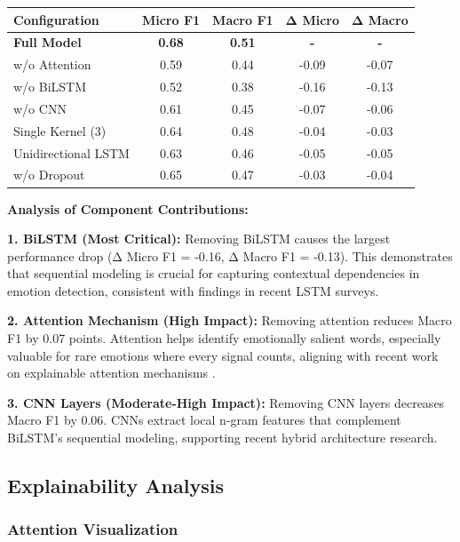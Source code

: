 \documentclass[12pt,a4paper]{article}
\begin{document}
\begin{tablebox}
\centering
\caption{Ablation Study Results}
\label{tab:ablation}
\begin{tabular}{lcccc}
\toprule
\textbf{Configuration} & \textbf{Micro F1} & \textbf{Macro F1} & \textbf{Δ Micro} & \textbf{Δ Macro} \\
\midrule
\textbf{Full Model} & \textbf{0.68} & \textbf{0.51} & \textbf{-} & \textbf{-} \\
\midrule
w/o Attention & 0.59 & 0.44 & -0.09 & -0.07 \\
w/o BiLSTM & 0.52 & 0.38 & -0.16 & -0.13 \\
w/o CNN & 0.61 & 0.45 & -0.07 & -0.06 \\
Single Kernel (3) & 0.64 & 0.48 & -0.04 & -0.03 \\
Unidirectional LSTM & 0.63 & 0.46 & -0.05 & -0.05 \\
w/o Dropout & 0.65 & 0.47 & -0.03 & -0.04 \\
\bottomrule
\end{tabular}
\end{tablebox}

\newpage

\textbf{Analysis of Component Contributions:}

\textbf{1. BiLSTM (Most Critical):}
Removing BiLSTM causes the largest performance drop (Δ Micro F1 = -0.16, Δ Macro F1 = -0.13). This demonstrates that sequential modeling is crucial for capturing contextual dependencies in emotion detection, consistent with findings in recent LSTM surveys.

\textbf{2. Attention Mechanism (High Impact):}
Removing attention reduces Macro F1 by 0.07 points. Attention helps identify emotionally salient words, especially valuable for rare emotions where every signal counts, aligning with recent work on explainable attention mechanisms \cite{sharma2023explainable}.

\textbf{3. CNN Layers (Moderate-High Impact):}
Removing CNN layers decreases Macro F1 by 0.06. CNNs extract local n-gram features that complement BiLSTM's sequential modeling, supporting recent hybrid architecture research.

\subsection{Explainability Analysis}

\subsubsection{Attention Visualization}
\end{document}
